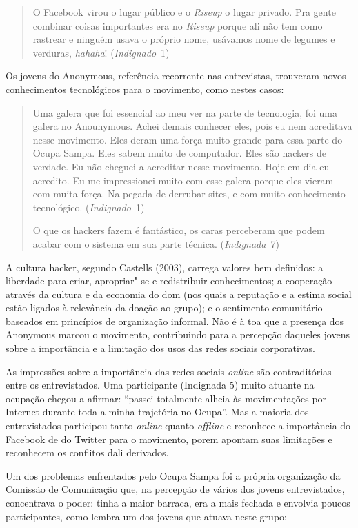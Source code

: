 \begin{quote}
O Facebook virou o lugar público e o \textit{Riseup} o lugar privado. Pra gente
combinar coisas importantes era no \textit{Riseup} porque ali não tem como
rastrear e ninguém usava o próprio nome, usávamos nome de legumes e
verduras, \textit{hahaha}! (\textit{Indignado}~1)
\end{quote}

Os jovens do Anonymous, referência recorrente nas entrevistas, trouxeram
novos conhecimentos tecnológicos para o movimento, como nestes casos:

\begin{quote}
Uma galera que foi essencial ao meu ver na parte de tecnologia, foi uma
galera no Anounymous. Achei demais conhecer eles, pois eu nem acreditava
nesse movimento. Eles deram uma força muito grande para essa parte do
Ocupa Sampa. Eles sabem muito de computador. Eles são hackers de
verdade. Eu não cheguei a acreditar nesse movimento. Hoje em dia eu
acredito. Eu me impressionei muito com esse galera porque eles vieram
com muita força. Na pegada de derrubar sites, e com muito conhecimento
tecnológico. (\textit{Indignado}~1)

O que os hackers fazem é fantástico, os caras perceberam que podem
acabar com o sistema em sua parte técnica. (\textit{Indignada}~7)
\end{quote}

A cultura hacker, segundo Castells (2003), carrega valores bem
definidos: a liberdade para criar, apropriar"-se e redistribuir
conhecimentos; a cooperação através da cultura e da economia do dom (nos
quais a reputação e a estima social estão ligados à relevância da doação
ao grupo); e o sentimento comunitário baseados em princípios de
organização informal. Não é à toa que a presença dos Anonymous marcou o
movimento, contribuindo para a percepção daqueles jovens sobre a
importância e a limitação dos usos das redes sociais corporativas.

As impressões sobre a importância das redes sociais \textit{online} são
contraditórias entre os entrevistados. Uma participante (Indignada
5) muito atuante na ocupação chegou a afirmar: ``passei totalmente
alheia às movimentações por Internet durante toda a minha trajetória no
Ocupa''. Mas a maioria dos entrevistados participou tanto
\textit{online} quanto \textit{offline} e reconhece a importância do
Facebook de do Twitter para o movimento, porem apontam suas limitações e
reconhecem os conflitos dali derivados.

Um dos problemas enfrentados pelo Ocupa Sampa foi a própria organização
da Comissão de Comunicação que, na percepção de vários dos jovens
entrevistados, concentrava o poder: tinha a maior barraca, era a mais
fechada e envolvia poucos participantes, como lembra um dos jovens
que atuava neste grupo:

